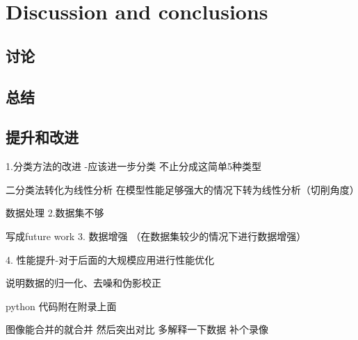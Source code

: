 \section{Discussion and conclusions}
\label{sec:results}

\subsection{讨论}

\subsection{总结}


\subsection{提升和改进}







1.分类方法的改进 -应该进一步分类 不止分成这简单5种类型

二分类法转化为线性分析 在模型性能足够强大的情况下转为线性分析（切削角度）

数据处理
2.数据集不够


写成future work
3. 数据增强 （在数据集较少的情况下进行数据增强）

4. 性能提升-对于后面的大规模应用进行性能优化

说明数据的归一化、去噪和伪影校正



python 代码附在附录上面

图像能合并的就合并 然后突出对比 多解释一下数据
补个录像
\FloatBarrier %